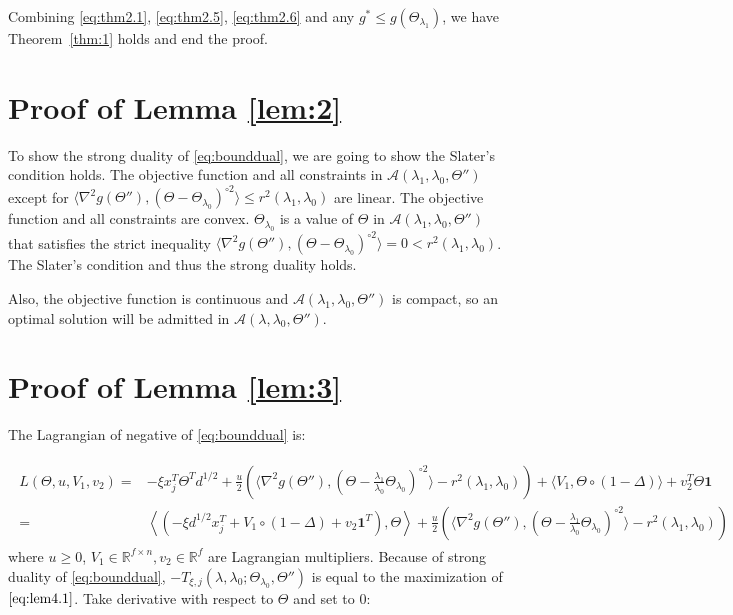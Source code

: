 Combining \eqref{eq:thm2.1}, \eqref{eq:thm2.5}, \eqref{eq:thm2.6} and any $g^*\leq g(\Theta_{\lambda_1})$, we have Theorem~\ref{thm:1} holds and end the proof.

\hspace{0 in}

\section{Proof of Lemma \ref{lem:2}}

To show the strong duality of \eqref{eq:bounddual}, we are going to show the Slater's condition holds. The objective function and all constraints in $\mathcal{A}(\lambda_1,{\lambda_0},\Theta'')$ except for $\langle\nabla^2 g(\Theta''),(\Theta-\Theta_{\lambda_0})^{\circ 2}\rangle\leq r^2(\lambda_1,\lambda_0)$ are linear. The objective function and all constraints are convex. $\Theta_{\lambda_0}$ is a value of $\Theta$ in $\mathcal{A}(\lambda_1,{\lambda_0},\Theta'')$ that satisfies the strict inequality $\langle\nabla^2 g(\Theta''),(\Theta-\Theta_{\lambda_0})^{\circ 2}\rangle=0< r^2(\lambda_1,\lambda_0)$. The Slater's condition and thus the strong duality holds.

Also, the objective function is continuous and $\mathcal{A}(\lambda_1,{\lambda_0},\Theta'')$ is compact, so an optimal solution will be admitted in $\mathcal{A}(\lambda,{\lambda_0},\Theta'')$.


\section{Proof of Lemma \ref{lem:3}}

The Lagrangian of negative of \eqref{eq:bounddual} is:

\begin{gather}
    \label{eq:lem4.1}
    \begin{aligned}
        L(\Theta,u,V_1,v_2)=&-\xi x_j^T\Theta^T d^{1/2}+\frac{u}{2}\left(\langle\nabla^2 g(\Theta''),(\Theta-\frac{\lambda_1}{\lambda_0}\Theta_{\lambda_0})^{\circ 2}\rangle-r^2(\lambda_1,\lambda_0)\right)
        +\langle V_1,\Theta\circ(1-\Delta)\rangle+v_2^T\Theta\mathbf{1}\\
        =&\left\langle\left(-\xi d^{1/2}x_j^T+V_1\circ(1-\Delta)+v_2\mathbf{1}^T\right),\Theta\right\rangle+\frac{u}{2}\left(\langle\nabla^2 g(\Theta''),(\Theta-\frac{\lambda_1}{\lambda_0}\Theta_{\lambda_0})^{\circ 2}\rangle-r^2(\lambda_1,\lambda_0)\right)
    \end{aligned}
\end{gather}
where $u\geq 0$, $V_1\in\mathbb{R}^{f\times n},v_2\in\mathbb{R}^f$ are Lagrangian multipliers. Because of strong duality of \eqref{eq:bounddual}, $-T_{\xi,j}(\lambda,\lambda_0;\Theta_{\lambda_0},\Theta'')$ is equal to the maximization of $\eqref{eq:lem4.1}$. Take derivative with respect to $\Theta$ and set to 0:

